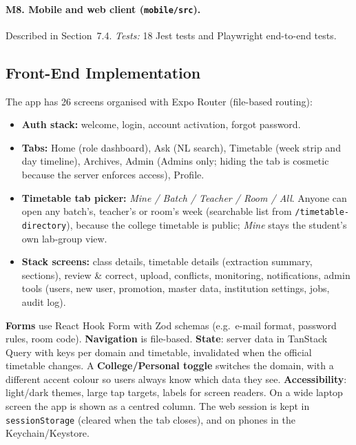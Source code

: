 \paragraph{M8. Mobile and web client (\texttt{mobile/src}).}
Described in Section~7.4. \emph{Tests:} 18 Jest tests and Playwright end-to-end tests.

\subsection{Front-End Implementation}
The app has 26 screens organised with Expo Router (file-based routing):
\begin{itemize}
\item \textbf{Auth stack:} welcome, login, account activation, forgot password.
\item \textbf{Tabs:} Home (role dashboard), Ask (NL search), Timetable (week strip and day timeline),
      Archives, Admin (Admins only; hiding the tab is cosmetic because the server enforces access), Profile.
\item \textbf{Timetable tab picker:} \emph{Mine / Batch / Teacher / Room / All}. Anyone can open any batch's,
      teacher's or room's week (searchable list from \texttt{/timetable-directory}), because the college
      timetable is public; \emph{Mine} stays the student's own lab-group view.
\item \textbf{Stack screens:} class details, timetable details (extraction summary, sections),
      review \& correct, upload, conflicts, monitoring, notifications, admin tools (users, new user,
      promotion, master data, institution settings, jobs, audit log).
\end{itemize}
\textbf{Forms} use React Hook Form with Zod schemas (e.g.\ e-mail format, password rules, room code).
\textbf{Navigation} is file-based. \textbf{State}: server data in TanStack Query with keys per domain
and timetable, invalidated when the official timetable changes. A
\textbf{College/Personal toggle} switches the domain, with a different accent colour so users always
know which data they see. \textbf{Accessibility}: light/dark themes, large tap targets, labels for
screen readers. On a wide laptop screen the app is shown as a centred column. The web session is kept in
\texttt{sessionStorage} (cleared when the tab closes), and on phones in the Keychain/Keystore.

